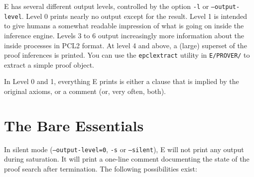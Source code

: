 \documentclass{report}
\begin{document}
E has several different output levels, controlled by the option
\texttt{-l} or \texttt{--output-level}. Level 0 prints nearly no
output except for the result. Level 1 is intended to give humans a
somewhat readable impression of what is going on inside the inference
engine.  Levels 3 to 6 output increasingly more information about the
inside processes in PCL2 format. At level 4 and above, a (large)
superset of the proof inferences is printed. You can use the
\texttt{epclextract} utility in \texttt{E/PROVER/} to extract a simple
proof object.

In Level 0 and 1, everything E prints is either a clause that is
implied by the original axioms, or a comment (or, very often, both).


\section{The Bare Essentials}
\label{sec:output:essentials}

In silent mode (\texttt{--output-level=0}, \texttt{-s} or
\texttt{--silent}), E will not print any output during saturation. It
will print a one-line comment documenting the state of the proof
search after termination. The following possibilities exist:
\end{document}
